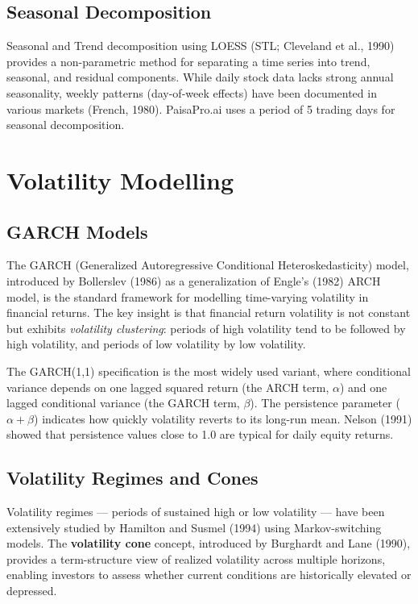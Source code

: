 \documentclass[12pt, a4paper, oneside]{report}
\newcommand{\projectname}{PaisaPro.ai}
\begin{document}
\subsection{Seasonal Decomposition}

Seasonal and Trend decomposition using LOESS (STL; Cleveland et al., 1990) provides a non-parametric method for separating a time series into trend, seasonal, and residual components. While daily stock data lacks strong annual seasonality, weekly patterns (day-of-week effects) have been documented in various markets (French, 1980). \projectname{} uses a period of 5 trading days for seasonal decomposition.

\section{Volatility Modelling}
\label{sec:lit_volatility}

\subsection{GARCH Models}

The GARCH (Generalized Autoregressive Conditional Heteroskedasticity) model, introduced by Bollerslev (1986) as a generalization of Engle's (1982) ARCH model, is the standard framework for modelling time-varying volatility in financial returns. The key insight is that financial return volatility is not constant but exhibits \textit{volatility clustering}: periods of high volatility tend to be followed by high volatility, and periods of low volatility by low volatility.

The GARCH(1,1) specification is the most widely used variant, where conditional variance depends on one lagged squared return (the ARCH term, $\alpha$) and one lagged conditional variance (the GARCH term, $\beta$). The persistence parameter ($\alpha + \beta$) indicates how quickly volatility reverts to its long-run mean. Nelson (1991) showed that persistence values close to 1.0 are typical for daily equity returns.

\subsection{Volatility Regimes and Cones}

Volatility regimes --- periods of sustained high or low volatility --- have been extensively studied by Hamilton and Susmel (1994) using Markov-switching models. The \textbf{volatility cone} concept, introduced by Burghardt and Lane (1990), provides a term-structure view of realized volatility across multiple horizons, enabling investors to assess whether current conditions are historically elevated or depressed.
\end{document}
